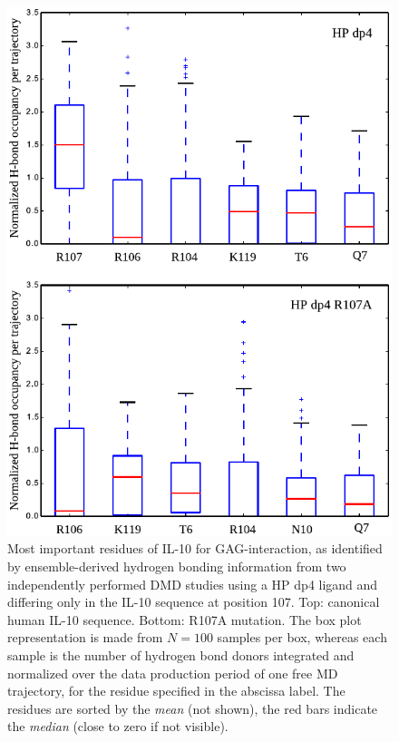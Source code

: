 \begin{figure}
\centering
\includegraphics[width=1.0\textwidth]{gfx/dmdil10/first_stage_Hbonding_hp_dp4_R107A_vs_unmutated.pdf}
\caption[]{Most important residues of IL-10 for GAG-interaction, as identified
by ensemble-derived hydrogen bonding information from two independently
performed DMD studies using a HP dp4 ligand and differing only in the IL-10
sequence at position 107. Top: canonical human IL-10 sequence. Bottom: R107A
mutation. The box plot representation is made from $N=100$ samples per box,
whereas each sample is the number of hydrogen bond donors integrated and
normalized over the data production period of one free MD trajectory, for the
residue specified in the abscissa label. The residues are sorted by the
\textit{mean} (not shown), the red bars indicate the \textit{median} (close to
zero if not visible).}
\label{fig:dmdil10:hpdp4_normal_vs_R107A}
\end{figure}

